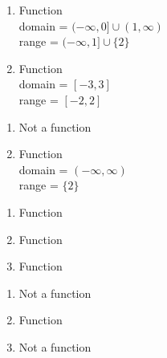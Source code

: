 \begin{multicols}{2}
\begin{enumerate}
\setcounter{enumi}{\value{HW}}

\item  Function \\  domain =  $(-\infty, 0] \cup (1, \infty)$ \\ range =  $(-\infty, 1] \cup \{ 2\}$

\vfill

\columnbreak

\item  Function \\ domain = $[-3,3]$ \\ range = $[-2,2]$

\setcounter{HW}{\value{enumi}}
\end{enumerate}
\end{multicols}

\begin{multicols}{2}
\begin{enumerate}
\setcounter{enumi}{\value{HW}}

\item  Not a function

\vfill

\columnbreak

\item  Function \\ domain = $(-\infty, \infty)$ \\ range = $\{2\}$

\setcounter{HW}{\value{enumi}}
\end{enumerate}
\end{multicols}



\begin{multicols}{3}
\begin{enumerate}
\setcounter{enumi}{\value{HW}}


\item Function
\item Function
\item Function

\setcounter{HW}{\value{enumi}}
\end{enumerate}
\end{multicols}

\begin{multicols}{3}
\begin{enumerate}
\setcounter{enumi}{\value{HW}}


\item Not a function
\item Function
\item Not a function

\setcounter{HW}{\value{enumi}}
\end{enumerate}
\end{multicols}

